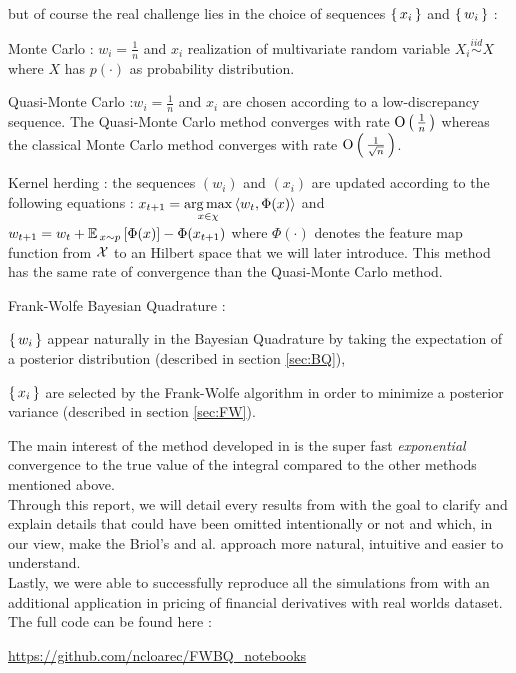  but of course the real challenge lies in the choice of sequences $\left \{ \, x_i \, \right \}$ and
 $\left \{ \, w_i \, \right \}$ :
  \begin{mydescription}
  \item [Monte Carlo]: $w_i = \frac{1}{n}$ and $x_i$ realization of multivariate random variable $X_i \stackrel{iid}{\sim} X$ where $X$ has $p(\cdot)$ as probability distribution.
  \item [Quasi-Monte Carlo]:$w_i = \frac{1}{n}$ and $x_i$ are chosen according to a low-discrepancy sequence. The Quasi-Monte Carlo method converges with rate $\mathrm{O}\left( \, \frac{1}{ n} \, \right)$ whereas the classical Monte Carlo method converges with rate $\mathrm{O} \left( \, \frac{1}{\sqrt { n }} \, \right)$.
 \item [Kernel herding]: the sequences $(w_i)$ and $(x_i)$ are updated according to the following equations : $x_{t+1} = \underset { x \in \chi}{ \operatorname*{arg\,max} } \left< { w }_{ t },\Phi (x) \right> $ and $w_{t+1} = { w }_{ t }+{ \mathbb{E} \, }_{ x\sim p }\left[ \Phi (x) \right] -\Phi ({ x }_{ t+1 })$ where $\Phi(\cdot)$ denotes the feature map function from $\mathcal{X}$ to an Hilbert space that we will later introduce. This method has the same rate of convergence than the Quasi-Monte Carlo method.
  \item [Frank-Wolfe Bayesian Quadrature]:
  \begin{myitemize}[0.2cm]
\item $\left \{ \, w_i \, \right \}$ appear naturally in the Bayesian Quadrature by taking the expectation of a posterior distribution  (described in section \ref{sec:BQ}),
\item $\left \{ \, x_i \, \right \}$ are selected by the Frank-Wolfe algorithm in order to minimize a posterior variance (described in section \ref{sec:FW}).
\end{myitemize}
  \end{mydescription}
  The main interest of the method developed in \cite{FWBQ} is the super fast
  \textit{exponential} convergence to the true value of the integral compared to the other methods mentioned above.\\

\noindent
  Through this report, we will detail every results from \cite{FWBQ} with the goal
  to clarify and explain details that could have been omitted intentionally or not and which, in our view, make the Briol's and al. approach more natural, intuitive and easier
  to understand.\\

  \noindent
  Lastly, we were able to successfully reproduce all the simulations from \cite{FWBQ} with an additional application in pricing of financial derivatives with real worlds dataset. The full code can be found here :
\begin{center}
  \url{https://github.com/ncloarec/FWBQ_notebooks}
\end{center}


